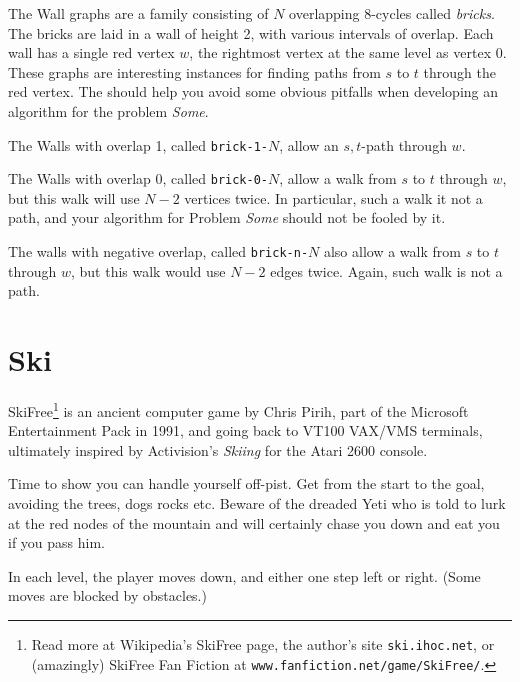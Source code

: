 \documentclass{tufte-handout}
\begin{document}
The Wall graphs are a family consisting of $N$ overlapping 8-cycles called \emph{bricks}.
The bricks are laid in a wall of height 2, with various intervals of overlap.
Each wall has a single red vertex $w$, the rightmost vertex at the same level as vertex $0$.
These graphs are interesting instances for finding paths from $s$ to $t$ through the red vertex.
The should help you avoid some obvious pitfalls when developing an algorithm for the problem \emph{Some}.

The Walls with overlap 1, called {\tt brick-1-$N$}, allow an $s,t$-path through $w$.

The Walls with overlap 0, called {\tt brick-0-$N$}, allow a walk from $s$ to $t$ through $w$, but this walk will use $N-2$ vertices twice. 
In particular, such a walk it not a path, and your algorithm for Problem \emph{Some} should not be fooled by it.

The walls with negative overlap, called {\tt brick-n-$N$} also allow a walk from $s$ to $t$ through $w$, but this walk would use $N-2$ edges twice.
Again, such walk is not a path.

\section{Ski}
SkiFree\footnote{Read more at Wikipedia’s SkiFree page, the author’s site {\tt ski.ihoc.net}, or (amazingly) SkiFree Fan Fiction at {\tt www.fanfiction.net/game/SkiFree/}.} is an ancient computer game by Chris Pirih, part of the Microsoft Entertainment Pack in 1991, and going back to VT100 VAX/VMS terminals, ultimately inspired by Activision’s \emph{Skiing} for the Atari 2600 console.

Time to show you can handle yourself off-pist. Get from the start to the goal, avoiding the trees, dogs rocks etc.
Beware of the dreaded Yeti who is told to lurk at the red nodes of the mountain and will certainly chase you down and eat you if you pass him.

In each level, the player moves down, and either one step left or right.
(Some moves are blocked by obstacles.)
\end{document}
